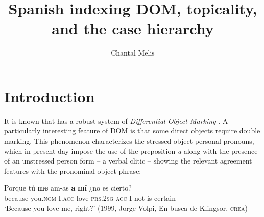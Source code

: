 \documentclass[output=paper]{LSP/langsci}
\author{Chantal Melis\affiliation{Universidad Nacional Autónoma de México}}
\title{Spanish indexing DOM, topicality, and the case hierarchy}
\begin{document}
\section{Introduction}\label{04-me-sec:1}

It is known that  has a robust system of \textit{Differential Object Marking} \citep{Bossong1991Differential,Bossong1998Marquage}. A particularly interesting feature of  DOM is that some direct objects require double marking. This phenomenon characterizes the stressed object personal pronouns, which in present day  impose the use of the preposition \textit{a} along with the presence of an unstressed person form – a verbal clitic – showing the relevant agreement features with the pronominal object phrase: 

\begin{exe}
\ex%
\label{04-me-ex:1}
\gll Porque tú \textbf{me} am-as \textbf{a} \textbf{mí}  ¿no es cierto?\\
 because you.\textsc{nom} I.\textsc{acc} love-\textsc{prs.2sg} \textsc{acc} I not is certain\\
\glt ‘Because you love me, right?’ (1999, Jorge Volpi, En busca de Klingsor, \textsc{crea})
\end{exe}
\end{document}

